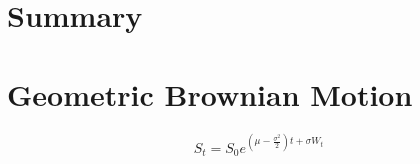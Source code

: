 \documentclass[journal,twocolumn,12pt]{ieeesyscoin}
\begin{document}
\lipsum[1]


\section{Summary}
\label{section:summary}

\lipsum[1]

\appendices

\section{Geometric Brownian Motion}
\label{sec:gbm}

\begin{equation}\label{eqn:gbm}
  S_{t} = S_{0} e^{(\mu - \frac{\sigma^2}{2})t  + \sigma W_{t} }
\end{equation}

\lipsum[1]
\end{document}
